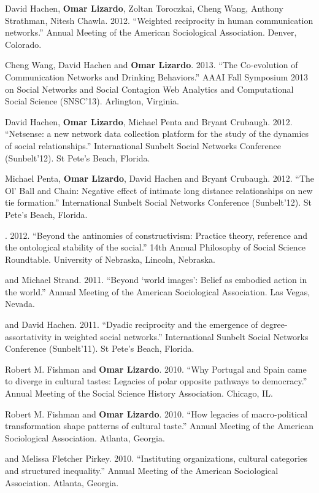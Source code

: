 \ind David Hachen, {\bf Omar Lizardo}, Zoltan Toroczkai,  Cheng Wang, Anthony Strathman, Nitesh Chawla. 2012. ``Weighted reciprocity in human communication networks.''  Annual Meeting of the American Sociological Association. Denver, Colorado. 

\ind Cheng Wang, David Hachen and {\bf Omar Lizardo}. 2013. ``The Co-evolution of Communication Networks and Drinking Behaviors.'' AAAI Fall Symposium 2013 on
Social Networks and Social Contagion Web Analytics and Computational Social Science (SNSC'13). Arlington, Virginia.

\ind David Hachen, {\bf Omar Lizardo}, Michael Penta and Bryant Crubaugh.  2012. ``Netsense: a new network data collection platform for the study of the dynamics of social relationships.''  International Sunbelt Social Networks Conference (Sunbelt'12). St Pete's Beach, Florida. 

\ind Michael Penta, {\bf Omar Lizardo}, David Hachen and Bryant Crubaugh. 2012. ``The Ol' Ball and Chain: Negative effect of intimate long distance relationships on new tie formation.'' International Sunbelt Social Networks Conference (Sunbelt'12). St Pete's Beach, Florida.

.  2012. ``Beyond the antinomies of constructivism:  Practice theory, reference and the ontological stability of the social.''  14th Annual Philosophy of Social Science Roundtable.  University of Nebraska, Lincoln, Nebraska.

 and Michael Strand. 2011.  ``Beyond `world images': Belief as embodied action in the world.''  Annual Meeting of the American Sociological Association. Las Vegas, Nevada. 

 and David Hachen. 2011.  ``Dyadic reciprocity and the emergence of degree-assortativity in weighted social networks.''  International Sunbelt Social Networks Conference (Sunbelt'11). St Pete's Beach, Florida. 

\ind Robert M. Fishman and {\bf Omar Lizardo}. 2010.  ``Why Portugal and Spain came to diverge in cultural tastes: Legacies of polar opposite pathways to democracy.'' Annual Meeting of the Social Science History Association. Chicago, IL. 

\ind Robert M. Fishman and {\bf Omar Lizardo}. 2010.  ``How legacies of macro-political transformation shape patterns of cultural taste.'' Annual Meeting of the American Sociological Association. Atlanta, Georgia. 

 and Melissa Fletcher Pirkey. 2010.  ``Instituting organizations, cultural categories and structured inequality.'' Annual Meeting of the American Sociological Association. Atlanta, Georgia. 


